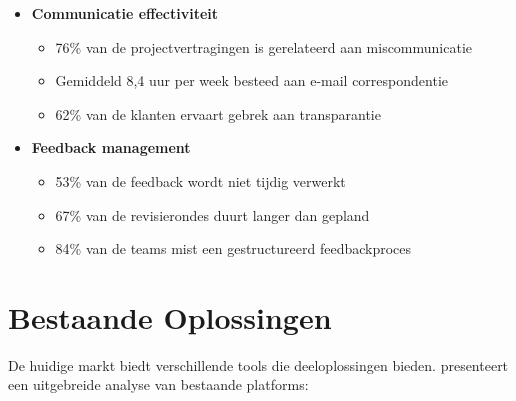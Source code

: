 \begin{itemize}
    \item \textbf{Communicatie effectiviteit}
    \begin{itemize}
        \item 76\% van de projectvertragingen is gerelateerd aan miscommunicatie
        \item Gemiddeld 8,4 uur per week besteed aan e-mail correspondentie
        \item 62\% van de klanten ervaart gebrek aan transparantie
    \end{itemize}
    
    \item \textbf{Feedback management}
    \begin{itemize}
        \item 53\% van de feedback wordt niet tijdig verwerkt
        \item 67\% van de revisierondes duurt langer dan gepland
        \item 84\% van de teams mist een gestructureerd feedbackproces
    \end{itemize}
\end{itemize}

\section{Bestaande Oplossingen}
\label{sec:bestaande-oplossingen}

De huidige markt biedt verschillende tools die deeloplossingen bieden. \textcite{Wilson2024} presenteert een uitgebreide analyse van bestaande platforms:

